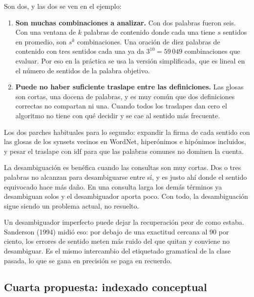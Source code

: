 \documentclass[11pt,letterpaper]{article}
\begin{document}
Son dos, y las dos se ven en el ejemplo:

\begin{enumerate}[itemsep=0.4em]
    \item \textbf{Son muchas combinaciones a analizar.} Con dos
          palabras fueron seis. Con una ventana de $k$ palabras de
          contenido donde cada una tiene $s$ sentidos en promedio,
          son $s^k$ combinaciones. Una oración de diez palabras de
          contenido con tres sentidos cada una ya da
          $3^{10} = 59\,049$ combinaciones que evaluar. Por eso en la
          práctica se usa la versión simplificada, que es lineal en
          el número de sentidos de la palabra objetivo.
    \item \textbf{Puede no haber suficiente traslape entre las
          definiciones.} Las glosas son cortas, una docena de
          palabras, y es muy común que dos definiciones correctas no
          compartan ni una. Cuando todos los traslapes dan cero el
          algoritmo no tiene con qué decidir y se cae al sentido más
          frecuente.
\end{enumerate}

Los dos parches habituales para lo segundo: expandir la firma de cada
sentido con las glosas de los synsets vecinos en WordNet, hiperónimos
e hipónimos incluidos, y pesar el traslape con idf para que las
palabras comunes no dominen la cuenta.

\begin{idea}
    La desambiguación es benéfica cuando las consultas son muy
    cortas. Dos o tres palabras no alcanzan para desambiguarse entre
    sí, y es justo ahí donde el sentido equivocado hace más daño. En
    una consulta larga los demás términos ya desambiguan solos y el
    desambiguador aporta poco. Con todo, la desambiguación sigue
    siendo un problema actual, no resuelto.
\end{idea}

\begin{ojo}
    Un desambiguador imperfecto puede dejar la recuperación peor de
    como estaba. Sanderson (1994) midió eso: por debajo de una
    exactitud cercana al $90$ por ciento, los errores de sentido
    meten más ruido del que quitan y conviene no desambiguar. Es el
    mismo intercambio del etiquetado gramatical de la clase pasada,
    lo que se gana en precisión se paga en recuerdo.
\end{ojo}

\subsection*{Cuarta propuesta: indexado conceptual}
\end{document}
